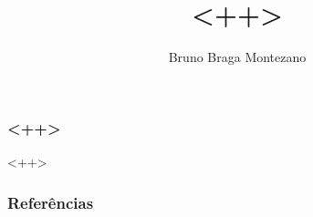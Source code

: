 \documentclass{beamer}
\title{<++>}
\author{Bruno Braga Montezano}
\institute{<++>}
\begin{document}
\ttfamily
\begin{frame}

\maketitle

\end{frame}

\begin{frame}
\frametitle{<++>}

<++>

\end{frame}

\begin{frame}
\frametitle{Referências}

\printbibliography

\end{frame}
\end{document}
